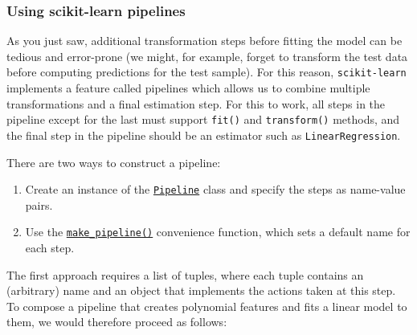 \documentclass{scrartcl}
\providecommand{\tightlist}{%
      \setlength{\itemsep}{0pt}\setlength{\parskip}{0pt}}
\begin{document}
    \begin{center}
    \end{center}
    
    \hypertarget{using-scikit-learn-pipelines}{%
\subsubsection{Using scikit-learn
pipelines}\label{using-scikit-learn-pipelines}}

As you just saw, additional transformation steps before fitting the
model can be tedious and error-prone (we might, for example, forget to
transform the test data before computing predictions for the test
sample). For this reason, \texttt{scikit-learn} implements a feature
called pipelines which allows us to combine multiple transformations and
a final estimation step. For this to work, all steps in the pipeline
except for the last must support \texttt{fit()} and \texttt{transform()}
methods, and the final step in the pipeline should be an estimator such
as \texttt{LinearRegression}.

There are two ways to construct a pipeline:

\begin{enumerate}
\def\labelenumi{\arabic{enumi}.}
\tightlist
\item
  Create an instance of the
  \href{https://scikit-learn.org/stable/modules/generated/sklearn.pipeline.Pipeline.html\#sklearn.pipeline.Pipeline}{\texttt{Pipeline}}
  class and specify the steps as name-value pairs.
\item
  Use the
  \href{https://scikit-learn.org/stable/modules/generated/sklearn.pipeline.make_pipeline.html}{\texttt{make\_pipeline()}}
  convenience function, which sets a default name for each step.
\end{enumerate}

The first approach requires a list of tuples, where each tuple contains
an (arbitrary) name and an object that implements the actions taken at
this step. To compose a pipeline that creates polynomial features and
fits a linear model to them, we would therefore proceed as follows:
\end{document}
